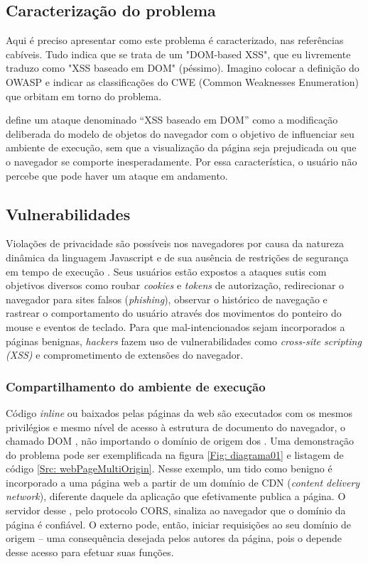 \subsection{Caracterização do problema}

\begin{todo}
Aqui é preciso apresentar como este problema é caracterizado, nas referências cabíveis. Tudo indica que se trata de um "DOM-based XSS", que eu livremente traduzo como "XSS baseado em DOM" (péssimo). Imagino colocar a definição do OWASP e indicar as classificações do CWE (Common Weaknesses Enumeration) que orbitam em torno do problema.
\end{todo}

\cite{OWASP:DOMXSS} define um ataque denominado ``XSS baseado em DOM'' como a modificação deliberada do modelo de objetos do navegador com o objetivo de influenciar seu ambiente de execução, sem que a visualização da página seja prejudicada ou que o navegador se comporte inesperadamente. Por essa característica, o usuário não percebe que pode haver um ataque em andamento.

\subsection{Vulnerabilidades}
Violações de privacidade são possíveis nos navegadores por causa da natureza dinâmica da linguagem Javascript e de sua ausência de restrições de segurança em tempo de execução \cite{Jang2010}. Seus usuários estão expostos a ataques sutis com objetivos diversos como roubar \textit{cookies} e \textit{tokens} de autorização, redirecionar o navegador para sites falsos (\textit{phishing}), observar o histórico de navegação e rastrear o comportamento do usuário através dos movimentos do ponteiro do mouse e eventos de teclado. Para que {\scripts} mal-intencionados sejam incorporados a páginas benignas, \textit{hackers} fazem uso de vulnerabilidades como \textit{cross-site scripting (XSS)} \cite{OWASP:XSS} e comprometimento de extensões \cite{Heule2015_Most_Dangerous_Code} do navegador.


\subsubsection{Compartilhamento do ambiente de execução}
Código \textit{inline} ou {\scripts} baixados pelas páginas da web são executados com os mesmos privilégios e mesmo nível de acesso à estrutura de documento do navegador, o chamado DOM \cite[p. 2-3]{DeRyck2012}, não importando o domínio de origem dos {\scripts}. Uma demonstração do problema pode ser exemplificada na figura \ref{Fig: diagrama01} e listagem de código \ref{Src: webPageMultiOrigin}. Nesse exemplo, um {\script} tido como benigno é incorporado a uma página web a partir de um domínio de CDN (\textit{content delivery network}), diferente daquele da aplicação que efetivamente publica a página. O servidor desse {\script}, pelo protocolo CORS, sinaliza ao navegador que o domínio da página é confiável. O {\script} externo pode, então, iniciar requisições ao seu domínio de origem -- uma consequência desejada pelos autores da página, pois o {\script} depende desse acesso para efetuar suas funções.

